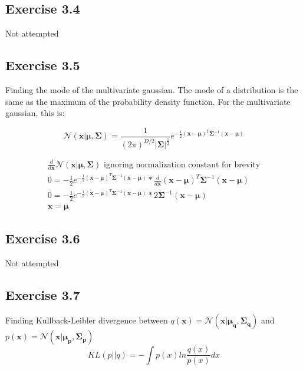 \subsection{Exercise 3.4}
Not attempted

\subsection{Exercise 3.5}
Finding the mode of the multivariate gaussian. The mode of a distribution is the same as the maximum of the probability density function. For the multivariate gaussian, this is:

\begin{equation}
  \mathcal{N}(\mathbf{x} | \mathbf{\mu}, \mathbf{\Sigma}) = \frac{1}{(2\pi)^{D/2}|\mathbf{\Sigma}|^\frac{1}{2}}e^{-\frac{1}{2}(\mathbf{x}-\mathbf{\mu})^T\mathbf{\Sigma}^{-1}(\mathbf{x}-\mathbf{\mu})}
\end{equation}

\begin{gather}
  \frac{d}{d\mathbf{x}} \mathcal{N}(\mathbf{x} | \mathbf{\mu}, \mathbf{\Sigma}) \text{ ignoring normalization constant for brevity} \\
  0 = -\frac{1}{2}e^{-\frac{1}{2}(\mathbf{x}-\mathbf{\mu})^T\mathbf{\Sigma}^{-1}(\mathbf{x}-\mathbf{\mu})} * \frac{d}{d\mathbf{x}}(\mathbf{x}-\mathbf{\mu})^T\mathbf{\Sigma}^{-1}(\mathbf{x}-\mathbf{\mu}) \\
  0 = -\frac{1}{2}e^{-\frac{1}{2}(\mathbf{x}-\mathbf{\mu})^T\mathbf{\Sigma}^{-1}(\mathbf{x}-\mathbf{\mu})} *2\mathbf{\Sigma}^{-1}(\mathbf{x}-\mathbf{\mu}) \\
  \mathbf{x} = \mathbf{\mu}
\end{gather}

\subsection{Exercise 3.6}
Not attempted

\subsection{Exercise 3.7}
Finding Kullback-Leibler divergence between $q(\mathbf{x}) = \mathcal{N}(\mathbf{x} | \mathbf{\mu_q}, \mathbf{\Sigma_q})$ and $p(\mathbf{x}) = \mathcal{N}(\mathbf{x} | \mathbf{\mu_p}, \mathbf{\Sigma_p})$
\begin{equation}
  KL(p||q) = -\int p(x) ln{\frac{q(x)}{p(x)}}dx 
\end{equation}

